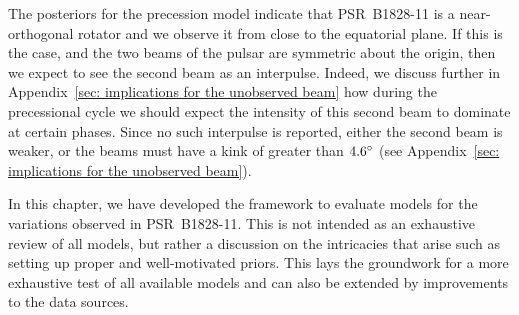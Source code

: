 \documentclass[../full_thesis/full_thesis.tex]{subfiles}
\begin{document}
The posteriors for the precession model indicate that PSR~B1828-11 is a
near-orthogonal rotator and we observe it from close to the equatorial plane.
If this is the case, and the two beams of the pulsar are symmetric about the
origin, then we expect to see the second beam as an interpulse. Indeed, we
discuss further in Appendix~\ref{sec: implications for the unobserved beam} how
during the precessional cycle we should expect the intensity of this second
beam to dominate at certain phases. Since no such interpulse is reported,
either the second beam is weaker, or the beams must have a kink of greater than
$4.6^{\circ}$ (see Appendix~\ref{sec: implications for the unobserved beam}).

In this chapter, we have developed the framework to evaluate models for the
variations observed in PSR~B1828-11. This is not intended as an exhaustive review
of all models, but rather a discussion on the intricacies that arise such as
setting up proper and well-motivated priors. This lays the groundwork
for a more exhaustive test of all available models and can also be extended
by improvements to the data sources.

\biblio
\end{document}
